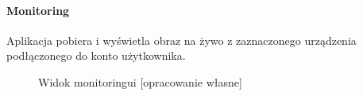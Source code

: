 \paragraph{Monitoring}
Aplikacja pobiera i wyświetla obraz na żywo z zaznaczonego urządzenia podłączonego do konto użytkownika.
\nopagebreak
\begin{figure}[H]
    \centering
    \hfill
    \hfill
    \caption{Widok monitoringui [opracowanie własne]}
    \label{fig:monitoring}
\end{figure}

